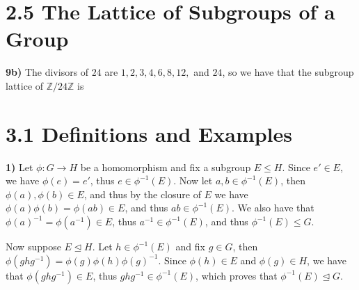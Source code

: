 \documentclass[12pt]{article}
\newcommand{\Z}{\mathbb{Z}}
\newcommand{\angleb}[1]{\left\langle#1\right\rangle}
\newcommand{\normsub}{\trianglelefteq}
\begin{document}
\pagestyle{fancy}

\setlength{\parindent}{0in}
\setlength{\parskip}{0.1in}

\section*{2.5 The Lattice of Subgroups of a Group}

\textbf{9b)}
The divisors of \( 24 \) are \( 1, 2, 3, 4, 6, 8, 12, \) and \( 24 \), so we
have that the subgroup lattice of \( \Z/24\Z \) is
\begin{center}
\end{center}

\section*{3.1 Definitions and Examples}

\textbf{1)}
Let \( \phi : G \to H \) be a homomorphism and fix a subgroup \( E \leq H \).
Since \( e' \in E \), we have \( \phi(e) = e' \), thus
\( e \in \phi^{-1}(E) \).
Now let \( a, b \in \phi^{-1}(E) \), then \( \phi(a), \phi(b) \in E \), and
thus by the closure of \( E \) we have \( \phi(a)\phi(b) = \phi(ab) \in E \),
and thus \( ab \in \phi^{-1}(E) \).
We also have that \( \phi(a)^{-1} = \phi(a^{-1}) \in E \), thus
\( a^{-1} \in \phi^{-1}(E) \), and thus \( \phi^{-1}(E) \leq G \).

Now suppose \( E \normsub H \).
Let \( h \in \phi^{-1}(E) \) and fix \( g \in G \), then
\( \phi(ghg^{-1}) = \phi(g)\phi(h)\phi(g)^{-1} \).
Since \( \phi(h) \in E \) and \( \phi(g) \in H \), we have that
\( \phi(ghg^{-1}) \in E \), thus \( ghg^{-1} \in \phi^{-1}(E) \), which proves
that \( \phi^{-1}(E) \normsub G \).
\end{document}
